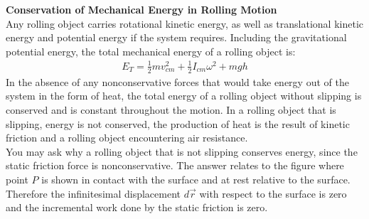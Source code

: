 \documentclass[a4paper]{article}
\let\bf\textbf
\begin{document}
\noindent\bf{Conservation of Mechanical Energy in Rolling Motion}
\vspace{2mm}\\
Any rolling object carries rotational kinetic energy, as well as translational kinetic energy and potential energy if the system requires. Including the gravitational potential energy, the total mechanical energy of a rolling object is:
\begin{align*}
    E_T = \frac{1}{2}mv^2_{cm} + \frac{1}{2}I_{cm}\omega^2 + mgh
\end{align*}
In the absence of any nonconservative forces that would take energy out of the system in the form of heat, the total energy of a rolling object without slipping is conserved and is constant throughout the motion. In a rolling object that is slipping, energy is not conserved, the production of heat is the result of kinetic friction and a rolling object encountering air resistance.\vspace{1mm}\\
You may ask why a rolling object that is not slipping conserves energy, since the static friction force is nonconservative. The answer relates to the figure where point $P$ is shown in contact with the surface and at rest relative to the surface. Therefore the infinitesimal displacement $d\vec{r}$ with respect to the surface is zero and the incremental work done by the static friction is zero.
\end{document}
